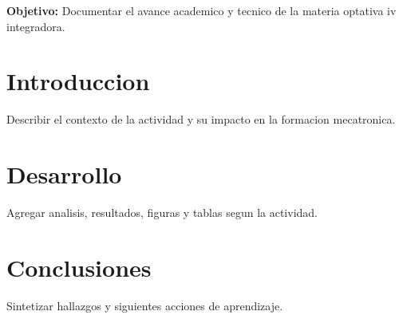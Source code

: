 \documentclass[spanish,letterpaper,oneside]{article}
\begin{document}
\templatePortrait
\templatePagecfg
\onehalfspacing

\begin{abstractd}
\textbf{Objetivo:} Documentar el avance academico y tecnico de la materia optativa iv integradora.
\end{abstractd}

\templateIndex
\templateFinalcfg

\section{Introduccion}
Describir el contexto de la actividad y su impacto en la formacion mecatronica.

\section{Desarrollo}
Agregar analisis, resultados, figuras y tablas segun la actividad.

\section{Conclusiones}
Sintetizar hallazgos y siguientes acciones de aprendizaje.



\end{document}
